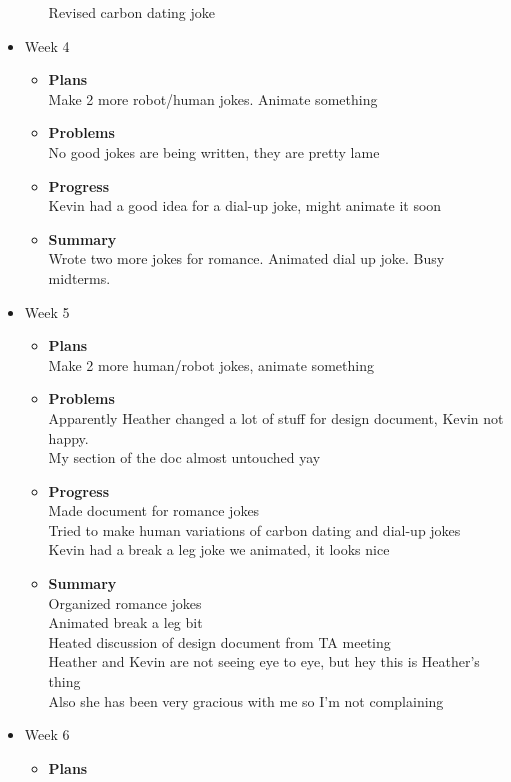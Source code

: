 \begin{itemize}
\begin{itemize}
Revised carbon dating joke
		\end{itemize}
		\item{Week 4}
		\begin{itemize}
			\item \textbf{Plans} \\
			Make 2 more robot/human jokes. Animate something
			\item \textbf{Problems} \\
			No good jokes are being written, they are pretty lame
			\item \textbf{Progress} \\
			Kevin had a good idea for a dial-up joke, might animate it soon
			\item \textbf{Summary} \\
			Wrote two more jokes for romance. Animated dial up joke. Busy midterms.
		\end{itemize}
		\item{Week 5}
		\begin{itemize}
			\item \textbf{Plans} \\
			Make 2 more human/robot jokes, animate something
			\item \textbf{Problems} \\
			Apparently Heather changed a lot of stuff for design document, Kevin not happy. \\
My section of the doc almost untouched yay
			\item \textbf{Progress} \\
			Made document for romance jokes
\\
Tried to make human variations of carbon dating and dial-up jokes
\\
Kevin had a break a leg joke we animated, it looks nice
			\item \textbf{Summary} \\
			Organized romance jokes \\
Animated break a leg bit \\
Heated discussion of design document from TA meeting \\
Heather and Kevin are not seeing eye to eye, but hey this is Heather's thing \\
Also she has been very gracious with me so I'm not complaining
		\end{itemize}
		\item{Week 6}
		\begin{itemize}
			\item \textbf{Plans} \\

\end{itemize}
\end{itemize}
